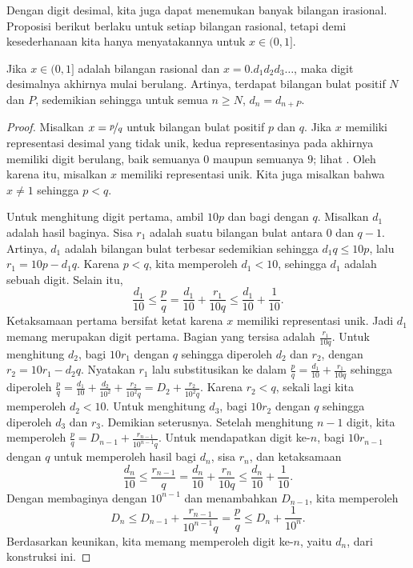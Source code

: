 Dengan digit desimal, kita juga dapat menemukan banyak bilangan irasional.
Proposisi berikut berlaku untuk setiap
bilangan rasional, tetapi demi kesederhanaan kita hanya menyatakannya untuk $x \in (0,1]$.

\begin{prop} \label{prop:rationaldecimal}
Jika $x \in (0,1]$ adalah bilangan rasional dan $x = 0.d_1d_2d_3\ldots$,
maka digit desimalnya akhirnya mulai berulang.  Artinya, terdapat
bilangan bulat positif $N$ dan $P$, sedemikian sehingga untuk semua $n \geq N$, $d_n = d_{n+P}$.
\end{prop}

\begin{proof}
Misalkan $x = \nicefrac{p}{q}$ untuk bilangan bulat positif $p$ dan $q$.
Jika $x$ memiliki representasi desimal yang tidak unik, kedua representasinya
pada akhirnya memiliki digit berulang,
baik semuanya $0$ maupun semuanya $9$;
lihat .
Oleh karena itu, misalkan $x$ memiliki representasi unik.
Kita juga misalkan bahwa $x \neq 1$ sehingga $p < q$.

Untuk menghitung digit pertama, ambil $10 p$ dan bagi dengan
$q$.  Misalkan $d_1$ adalah hasil baginya.
Sisa $r_1$ adalah suatu bilangan bulat
antara $0$ dan $q-1$.  Artinya, $d_1$ adalah bilangan bulat terbesar
sedemikian sehingga $d_1 q \leq 10p$, lalu $r_1 = 10p - d_1q$.
Karena $p < q$, kita memperoleh $d_1 < 10$, sehingga $d_1$ adalah sebuah digit.
Selain itu,
\begin{equation*}
\frac{d_1}{10} \leq \frac{p}{q} =
\frac{d_1}{10} + \frac{r_1}{10q} \leq \frac{d_1}{10} +
\frac{1}{10} .
\end{equation*}
Ketaksamaan pertama bersifat ketat karena $x$ memiliki
representasi unik.  Jadi $d_1$ memang merupakan digit pertama.
Bagian yang tersisa adalah $\frac{r_1}{10q}$.
Untuk menghitung $d_2$, bagi $10 r_1$ dengan $q$ sehingga diperoleh $d_2$
dan $r_2$, dengan $r_2 = 10 r_1 - d_2 q$.
Nyatakan $r_1$ lalu substitusikan ke dalam
$\frac{p}{q} = \frac{d_1}{10} + \frac{r_1}{10 q}$
sehingga diperoleh
$\frac{p}{q} = \frac{d_1}{10} + \frac{d_2}{{10}^2} +
\frac{r_2}{{10}^2 q} = D_2 +
\frac{r_2}{{10}^2 q}$.
Karena $r_2 < q$, sekali lagi kita memperoleh $d_2 < 10$.
Untuk menghitung $d_3$, bagi $10 r_2$ dengan $q$
sehingga diperoleh $d_3$ dan $r_3$.  Demikian seterusnya.
Setelah menghitung $n-1$ digit, kita memperoleh
$\frac{p}{q} = D_{n-1} + \frac{r_{n-1}}{10^{n-1} q}$.
Untuk mendapatkan digit ke-$n$,
bagi $10 r_{n-1}$ dengan $q$
untuk memperoleh hasil bagi $d_n$, sisa $r_n$, dan ketaksamaan
\begin{equation*}
\frac{d_n}{10} \leq \frac{r_{n-1}}{q} =
\frac{d_n}{10} + \frac{r_n}{10q} \leq \frac{d_n}{10} +
\frac{1}{10} .
\end{equation*}
Dengan membaginya dengan $10^{n-1}$ dan menambahkan $D_{n-1}$, kita memperoleh
\begin{equation*}
D_n \leq D_{n-1} + \frac{r_{n-1}}{10^{n-1} q} = \frac{p}{q} \leq D_n +
\frac{1}{10^n} .
\end{equation*}
Berdasarkan keunikan, kita memang memperoleh
digit ke-$n$, yaitu $d_n$, dari konstruksi ini.


\end{proof}
